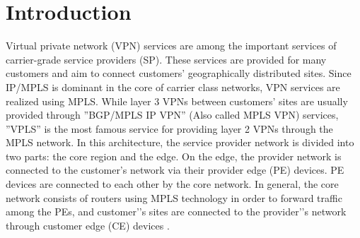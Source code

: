 \documentclass[10pt,conference]{IEEEtran}
\begin{document}
\IEEEpeerreviewmaketitle



\section{Introduction}
Virtual private network (VPN) services are among the important services of carrier-grade service providers (SP). These services are provided for many customers and aim to connect customers' geographically distributed sites. Since IP/MPLS is dominant in the core of carrier class  networks, VPN services are realized using MPLS. While layer 3 VPNs between customers' sites are usually provided through ''BGP/MPLS IP VPN'' (Also called MPLS VPN) services, ''VPLS'' is the most famous service for providing layer 2 VPNs through the MPLS network. In this architecture, the service provider network is divided into two parts: the core region and the edge. On the edge, the provider network is connected to the customer's network via their provider edge (PE) devices. PE devices are connected to each other by the core network. In general, the core network consists of routers using MPLS technology in order to forward traffic among the PEs, and customer’'s sites are connected to the provider’'s network through customer edge (CE) devices \cite{14}.
\end{document}
